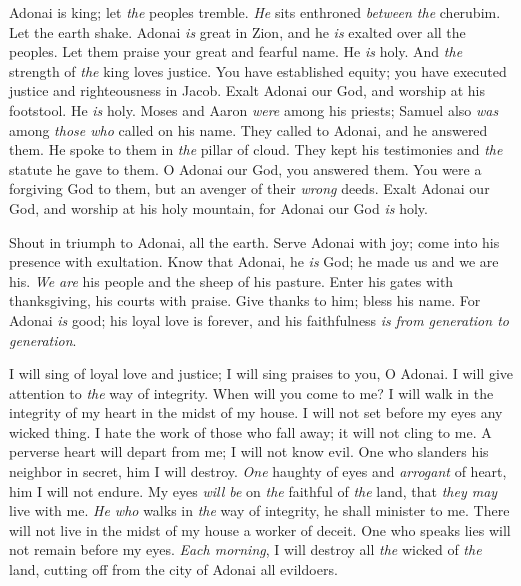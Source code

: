 \begin{biblechapter} %
 Adonai is king; let \textit{the} peoples tremble. 
\textit{He} sits enthroned \textit{between the} cherubim. Let the earth shake.
\verse Adonai \textit{is} great in Zion, 
and he \textit{is} exalted over all the peoples.
\verse Let them praise your great and fearful name. 
He \textit{is} holy.
\verse And \textit{the} strength of \textit{the} king loves justice. 
You have established equity; 
you have executed justice and righteousness in Jacob.
\verse Exalt Adonai our God, 
and worship at his footstool. 
He \textit{is} holy.
\verse Moses and Aaron \textit{were} among his priests; 
Samuel also \textit{was} among \textit{those who} called on his name. 
They called to Adonai, and he answered them.
\verse He spoke to them in \textit{the} pillar of cloud. 
They kept his testimonies and \textit{the} statute he gave to them.
\verse O Adonai our God, you answered them. 
You were a forgiving God to them, 
but an avenger of their \textit{wrong} deeds.
\verse Exalt Adonai our God, 
and worship at his holy mountain, 
for Adonai our God \textit{is} holy.
\end{biblechapter}

\begin{biblechapter} %
 Shout in triumph to Adonai, all the earth.
\verse Serve Adonai with joy; 
come into his presence with exultation.
\verse Know that Adonai, he \textit{is} God; 
he made us and we are his. 
\textit{We are} his people and the sheep of his pasture.
\verse Enter his gates with thanksgiving, 
his courts with praise. 
Give thanks to him; bless his name.
\verse For Adonai \textit{is} good; his loyal love is forever, 
and his faithfulness \textit{is} \textit{from generation to generation}.
\end{biblechapter}

\begin{biblechapter} %
 I will sing of loyal love and justice; 
I will sing praises to you, O Adonai.
\verse I will give attention to \textit{the} way of integrity. 
When will you come to me? 
I will walk in the integrity of my heart 
in the midst of my house.
\verse I will not set before my eyes 
any wicked thing. 
I hate the work of those who fall away; 
it will not cling to me.
\verse A perverse heart will depart from me; 
I will not know evil.
\verse One who slanders his neighbor in secret, 
him I will destroy. 
\textit{One} haughty of eyes and \textit{arrogant} of heart, 
him I will not endure.
\verse My eyes \textit{will be} on \textit{the} faithful of \textit{the} land, 
that \textit{they may} live with me. 
\textit{He who} walks in \textit{the} way of integrity, 
he shall minister to me.
\verse There will not live in the midst of my house 
a worker of deceit. 
One who speaks lies 
will not remain before my eyes.
\verse \textit{Each morning}, 
I will destroy all \textit{the} wicked of \textit{the} land, 
cutting off from the city of Adonai all evildoers.
\end{biblechapter}

